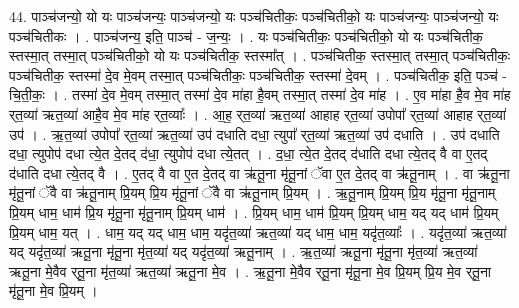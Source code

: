 \documentclass[17pt]{extarticle}
\begin{document}
44. पाञ्च॑जन्यो॒ यो यः पाञ्च॑जन्यः॒ पाञ्च॑जन्यो॒ यः पञ्च॑चितीकः॒ पञ्च॑चितीको॒ यः पाञ्च॑जन्यः॒ पाञ्च॑जन्यो॒ यः पञ्च॑चितीकः । . पाञ्च॑जन्य॒ इति॒ पाञ्च॑ - ज॒न्यः॒ । . यः पञ्च॑चितीकः॒ पञ्च॑चितीको॒ यो यः पञ्च॑चितीक॒ स्तस्मा॒त् तस्मा॒त् पञ्च॑चितीको॒ यो यः पञ्च॑चितीक॒ स्तस्मा᳚त् । . पञ्च॑चितीक॒ स्तस्मा॒त् तस्मा॒त् पञ्च॑चितीकः॒ पञ्च॑चितीक॒ स्तस्मा॑ दे॒व मे॒वम् तस्मा॒त् पञ्च॑चितीकः॒ पञ्च॑चितीक॒ स्तस्मा॑ दे॒वम् । . पञ्च॑चितीक॒ इति॒ पञ्च॑ - चि॒ती॒कः॒ । . तस्मा॑ दे॒व मे॒वम् तस्मा॒त् तस्मा॑ दे॒व मा॑हा है॒वम् तस्मा॒त् तस्मा॑ दे॒व मा॑ह । . ए॒व मा॑हा है॒व मे॒व मा॑ह र्‌त॒व्या॑ ऋत॒व्या॑ आहै॒व मे॒व मा॑ह र्‌त॒व्याः᳚ । . आ॒ह॒ र्‌त॒व्या॑ ऋत॒व्या॑ आहाह र्‌त॒व्या॑ उपोपा᳚ र्‌त॒व्या॑ आहाह र्‌त॒व्या॑ उप॑ । . ऋ॒त॒व्या॑ उपोपा᳚ र्‌त॒व्या॑ ऋत॒व्या॑ उप॑ दधाति दधा॒ त्युपा᳚ र्‌त॒व्या॑ ऋत॒व्या॑ उप॑ दधाति । . उप॑ दधाति दधा॒ त्युपोप॑ दधा त्ये॒त दे॒तद् द॑धा॒ त्युपोप॑ दधा त्ये॒तत् । . द॒धा॒ त्ये॒त दे॒तद् द॑धाति दधा त्ये॒तद् वै वा ए॒तद् द॑धाति दधा त्ये॒तद् वै । . ए॒तद् वै वा ए॒त दे॒तद् वा ऋ॑तू॒ना मृ॑तू॒नां ॅवा ए॒त दे॒तद् वा ऋ॑तू॒नाम् । . वा ऋ॑तू॒ना मृ॑तू॒नां ॅवै वा ऋ॑तू॒नाम् प्रि॒यम् प्रि॒य मृ॑तू॒नां ॅवै वा ऋ॑तू॒नाम् प्रि॒यम् । . ऋ॒तू॒नाम् प्रि॒यम् प्रि॒य मृ॑तू॒ना मृ॑तू॒नाम् प्रि॒यम् धाम॒ धाम॑ प्रि॒य मृ॑तू॒ना मृ॑तू॒नाम् प्रि॒यम् धाम॑ । . प्रि॒यम् धाम॒ धाम॑ प्रि॒यम् प्रि॒यम् धाम॒ यद् यद् धाम॑ प्रि॒यम् प्रि॒यम् धाम॒ यत् । . धाम॒ यद् यद् धाम॒ धाम॒ यदृ॑त॒व्या॑ ऋत॒व्या॑ यद् धाम॒ धाम॒ यदृ॑त॒व्याः᳚ । . यदृ॑त॒व्या॑ ऋत॒व्या॑ यद् यदृ॑त॒व्या॑ ऋतू॒ना मृ॑तू॒ना मृ॑त॒व्या॑ यद् यदृ॑त॒व्या॑ ऋतू॒नाम् । . ऋ॒त॒व्या॑ ऋतू॒ना मृ॑तू॒ना मृ॑त॒व्या॑ ऋत॒व्या॑ ऋतू॒ना मे॒वैव र्‌तू॒ना मृ॑त॒व्या॑ ऋत॒व्या॑ ऋतू॒ना मे॒व । . ऋ॒तू॒ना मे॒वैव र्‌तू॒ना मृ॑तू॒ना मे॒व प्रि॒यम् प्रि॒य मे॒व र्‌तू॒ना मृ॑तू॒ना मे॒व प्रि॒यम् । \newline
\end{document}
